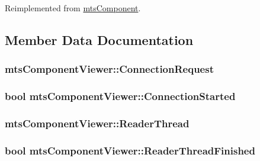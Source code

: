 Reimplemented from \hyperlink{classmts_component_aaf28f0262b44eb6866e10089a02fa6e4}{mts\-Component}.



\subsection{Member Data Documentation}
\hypertarget{classmts_component_viewer_ab4e2905d1679386f9a8d15d0bcaaf996}{
\subsubsection[{Connection\-Request}]{ mts\-Component\-Viewer\-::\-Connection\-Request\hspace{0.3cm}{\ttfamily [protected]}}}\label{classmts_component_viewer_ab4e2905d1679386f9a8d15d0bcaaf996}
\hypertarget{classmts_component_viewer_aa6617f20137e55bf8fe983d8587a22d2}{
\subsubsection[{Connection\-Started}]{\setlength{\rightskip}{0pt plus 5cm}bool mts\-Component\-Viewer\-::\-Connection\-Started\hspace{0.3cm}{\ttfamily [protected]}}}\label{classmts_component_viewer_aa6617f20137e55bf8fe983d8587a22d2}
\hypertarget{classmts_component_viewer_a5b608706d9dec221cd4ca599a165fec7}{
\subsubsection[{Reader\-Thread}]{ mts\-Component\-Viewer\-::\-Reader\-Thread\hspace{0.3cm}{\ttfamily [protected]}}}\label{classmts_component_viewer_a5b608706d9dec221cd4ca599a165fec7}
\hypertarget{classmts_component_viewer_ab5cfa733f00890d5ee7ef44eac6624cf}{
\subsubsection[{Reader\-Thread\-Finished}]{\setlength{\rightskip}{0pt plus 5cm}bool mts\-Component\-Viewer\-::\-Reader\-Thread\-Finished\hspace{0.3cm}{\ttfamily [protected]}}}\label{classmts_component_viewer_ab5cfa733f00890d5ee7ef44eac6624cf}
